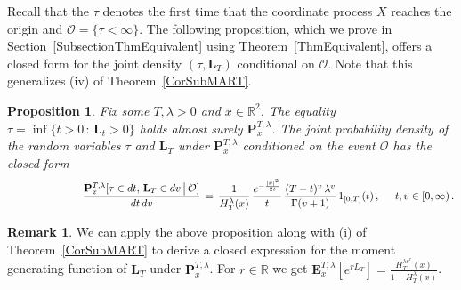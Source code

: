 \documentclass[10pt]{article}
\numberwithin{equation}{section}
\newtheorem{proposition}[theorem]{Proposition}
\theoremstyle{definition}
\newtheorem{remark}[theorem]{Remark}
\newcommand{\R}{{\mathbb R}}
\begin{document}
Recall that the  $\tau$ denotes the first time that the coordinate process $X$ reaches the origin and $\mathcal{O}=\{ \tau<\infty\}$.  The following proposition, which we prove  in Section~\ref{SubsectionThmEquivalent} using Theorem~\ref{ThmEquivalent}, offers a closed form for the joint density $(\tau,\mathbf{L}_{T})$ conditional on $\mathcal{O}$.  Note that this generalizes (iv) of Theorem~\ref{CorSubMART}.
\begin{proposition}\label{PropLocalTimeProp} Fix some  $T,\lambda > 0$ and $x\in \R^2$.
The equality  $\tau=\inf\{t > 0 \, :\, \mathbf{L}_{t}>0 \}    $ holds almost surely $\mathbf{P}_{x }^{T,\lambda}$. The joint probability density of the random variables $\tau$ and $\mathbf{L}_T$ under $\mathbf{P}_{x }^{T,\lambda}$ conditioned on the event $\mathcal{O}$ has the closed form
$$  \text{}\hspace{2.5cm} \frac{ \mathbf{P}_{x }^{T,\lambda}[\tau\in dt,\, \mathbf{L}_T \in dv\,\big|\,\mathcal{O}]}{dt\,dv}  \,=\,  \frac{1}{H_{T}^{\lambda}(x)  } \,\frac{ e^{-\frac{ |x|^2 }{2t  }  }  }{ t } \,\frac{ (T-t)^v \,\lambda^v }{\Gamma(v+1)}\, 1_{[0,T]}(t)\,,  \hspace{.5cm}  t,v\in [0,\infty)\,. $$
\end{proposition}

\begin{remark}\label{RemarkMargLoc}  We can apply the above proposition along with (i) of Theorem~\ref{CorSubMART} to derive a closed expression for the moment generating function of $\mathbf{L}_T$ under $\mathbf{P}_{x }^{T,\lambda}$.  For $r\in \R$ we get  $\mathbf{E}_{x }^{T,\lambda}[e^{rL_T}]=\frac{H_{T}^{\lambda e^r}(x)  }{ 1+H_{T}^{\lambda}(x)   }  $.
\end{remark}
\end{document}
